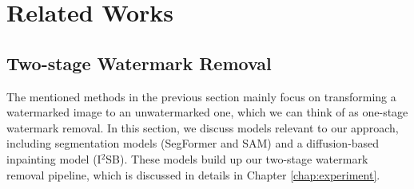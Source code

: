 \chapter{Related Works}
\label{chapter:related-works}


\section{Two-stage Watermark Removal}

The mentioned methods in the previous section mainly focus on transforming a watermarked image to an unwatermarked one, which we can think of as one-stage watermark removal. In this section, we discuss models relevant to our approach, including segmentation models (SegFormer and SAM) and a diffusion-based inpainting model (I$^2$SB). These models build up our two-stage watermark removal pipeline, which is discussed in details in Chapter \ref{chap:experiment}.


